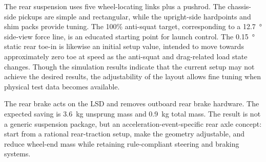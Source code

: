 The rear suspension uses five wheel-locating links plus a pushrod. The chassis-side pickups are simple and rectangular, while the upright-side hardpoints and shim packs provide tuning. The 100\% anti-squat target, corresponding to a \SI{12.7}{\degree} side-view force line, is an educated starting point for launch control. The \SI{0.15}{\degree} static rear toe-in is likewise an initial setup value, intended to move towards approximately zero toe at speed as the anti-squat and drag-related load state changes. Though the simulation results indicate that the current setup may not achieve the desired results, the adjustability of the layout allows fine tuning when physical test data becomes available.

The rear brake acts on the LSD and removes outboard rear brake hardware. The expected saving is \SI{3.6}{kg} unsprung mass and \SI{0.9}{kg} total mass. The result is not a generic suspension package, but an acceleration-event-specific rear axle concept: start from a rational rear-traction setup, make the geometry adjustable, and reduce wheel-end mass while retaining rule-compliant steering and braking systems.
